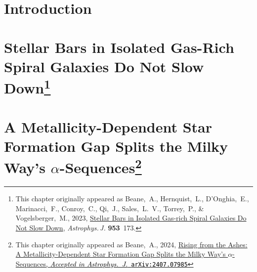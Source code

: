 \documentclass[11pt]{gsasthesis} %
\newcommand{\doi}[2]{\href{http://dx.doi.org/#1}{{#2}}}
\newcommand{\arxivaccept}[3]{\href{http://arxiv.org/abs/#1}{{#2}\textcolor{black}{, \textit{Accepted in #3}}\ \textcolor{black}{\texttt{arXiv:#1}}}}
\begin{document}
\tableofcontents %





\chapter{Introduction}\label{ch:intro}


\chapter{Stellar Bars in Isolated Gas-Rich Spiral Galaxies Do Not Slow Down\footnote{This chapter originally appeared as Beane,~A., Hernquist,~L., D'Onghia,~E., Marinacci,~F., Conroy,~C., Qi,~J., 
Sales,~L.~V., Torrey,~P., \& Vogelsberger,~M., 2023, \doi{10.3847/1538-4357/ace2b9}{Stellar Bars in Isolated 
Gas-rich Spiral Galaxies Do Not Slow Down}, \textit{Astrophys.\,J.} \textbf{953}~173.}}\label{ch:gasbar}


\chapter{A Metallicity-Dependent Star Formation Gap Splits the Milky Way's \texorpdfstring{$\alpha$}{α}-Sequences\footnote{This chapter originally appeared as Beane,~A., 2024, \arxivaccept{2407.07985}{Rising from the Ashes: A Metallicity-Dependent Star Formation Gap Splits the Milky Way's $\alpha$-Sequences}{Astrophys.~J.}}}\label{ch:GSEgas}

\end{document}
